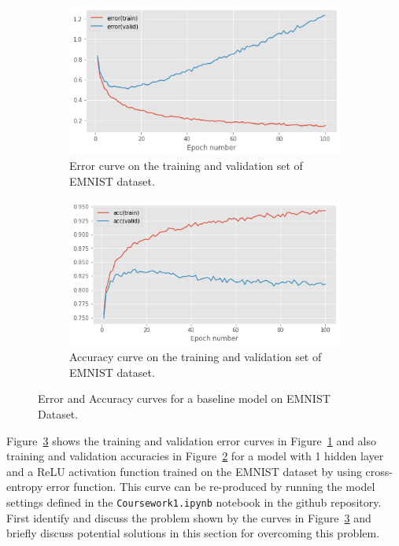 \documentclass[11pt,]{article}
\begin{document}
\begin{figure}
\centering

\begin{subfigure}{.8\textwidth}
\centering

\includegraphics[width=0.75\linewidth]{error_IHO_withrelu.png}
\caption{Error curve on the training and validation set of EMNIST dataset.} 
\label{fig:error}
\end{subfigure}
\centering

\begin{subfigure}{.8\textwidth}
\centering

\includegraphics[width=0.8\linewidth]{accuracy_IHO_withrelu.png}
\caption{Accuracy curve on the training and validation set of EMNIST dataset.}

\label{fig:accuracy}
\end{subfigure}
\caption{Error and Accuracy curves for a baseline model on EMNIST Dataset.}
\label{fig:errorfn}

\end{figure}

Figure~\ref{fig:errorfn} shows the training and validation error curves in Figure~\ref{fig:error} and also training and validation accuracies in Figure~\ref{fig:accuracy} for a model with 1 hidden layer and a ReLU activation function trained on the EMNIST dataset by using cross-entropy error function. 
This curve can be re-produced by running the model settings defined in the \texttt{Coursework1.ipynb} notebook in the github repository.
First identify and discuss the problem shown by the curves in Figure~\ref{fig:errorfn} and briefly discuss potential solutions in this section for overcoming this problem.
\end{document}
